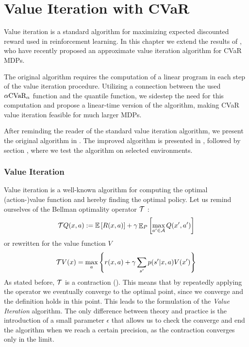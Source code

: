 \chapter{Value Iteration with CVaR}\label{ch:vi}

Value iteration is a standard algorithm for maximizing expected discounted reward used in reinforcement learning. In this chapter we extend the results of \citet{chow2015risk}, who have recently proposed an approximate value iteration algorithm for CVaR MDPs. 

The original algorithm requires the computation of a linear program in each step of the value iteration procedure. Utilizing a connection between the used $\alpha \text{CVaR}_\alpha$ function and the quantile function, we sidestep the need for this computation and propose a linear-time version of the algorithm, making CVaR value iteration feasible for much larger MDPs. 

After reminding the reader of the standard value iteration algorithm, we present the original algorithm in . The improved algorithm is presented in  , followed by section , where we test the algorithm on selected environments.


\subsection{Value Iteration}

Value iteration \citep{sutton1998reinforcement} is a well-known algorithm for computing the optimal (action-)value function and hereby finding the optimal policy. Let us remind ourselves of the Bellman optimality operator $\mathcal{T}$ :
\begin{equation*}
\mathcal{T} Q(x,a) := \mathbb{E}\left[ { R(x, a)} \right] + \gamma \mathop{\mathbb{E}}\nolimits_{P} \left[ {\max_{a' \in \mathcal{A}}Q(x', a')} \right]
\end{equation*}
or rewritten for the value function $V$
\begin{equation}
\mathcal{T} V(x) = \max_a\left\{ {r(x, a) + \gamma\sum_{s'}p(s'|x, a)V(x')} \right\}
\end{equation}
As stated before, $\mathcal{T}$ is a contraction (). This means that by repeatedly applying the operator we eventually converge to the optimal point, since we converge and the definition holds in this point. This leads to the formulation of the \textit{Value Iteration} algorithm. The only difference between theory and practice is the introduction of a small parameter $\epsilon$ that allows us to check the converge and end the algorithm when we reach a certain precision, as the contraction converges only in the limit.

